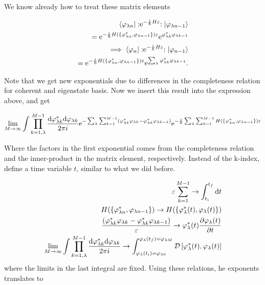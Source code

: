 We know already how to treat these matrix elements

\begin{align*}
    \bra{\varphi_{\lambda n}} :\mathrel{\mathrm{e}^{-\frac{i}{\hbar} H \varepsilon}}:\ket{\varphi_{\lambda n-1}} \\ = \mathrm{e}^{-\frac{i}{\hbar} H(\{\varphi_{\lambda n}^{*}, \varphi_{\lambda n-1}\}) \varepsilon } \mathrm{e}^{\varphi_{\lambda k}^{*}\varphi_{\lambda k-1}} \\ 
    \implies \bra{\varphi_{n}} :\mathrel{\mathrm{e}^{-\frac{i}{\hbar} H \varepsilon}}:\ket{\varphi_{n-1}} \\ = \mathrm{e}^{-\frac{i}{\hbar} H(\{\varphi_{\lambda n}^{*}, \varphi_{\lambda n-1}\} ) \varepsilon} \mathrm{e}^{\sum_{\lambda} \varphi_{\lambda k}^{*}\varphi_{\lambda k-1}}.
\end{align*}

Note that we get new exponentials due to differences in the completeness relation for coherent and eigenstate basis. Now we insert this result into the expression above, and get

\begin{align*}
    \lim_{M \to \infty} \int \prod_{k = 1, \lambda}^{M-1} \frac{\dd \varphi_{\lambda k}^{*} \dd \varphi_{\lambda k}}{2\pi i} \mathrm{e}^{-\sum_{\lambda} \sum_{k = 1}^{M-1}\left(\varphi_{\lambda k}^{*} \varphi_{\lambda k} - \varphi_{\lambda k}^{*} \varphi_{\lambda k - 1}\right)} \mathrm{e}^{-\frac{i}{\hbar} \sum_{\lambda} \sum_{k = 1}^{M-1} H(\{\varphi_{\lambda n}^{*}, \varphi_{\lambda n-1}\} ) \varepsilon}
\end{align*}

Where the factors in the first exponential comes from the completeness relation and the inner-product in the matrix element, respectively. Instead of the k-index, define a time variable $t$, similar to what we did before. 

\begin{align*}
    \varepsilon \sum_{k = 1}^{M-1}  \to \int_{t_{i}}^{t_{f}} \dd t \\ 
    H(\{\varphi_{\lambda n}^{*}, \varphi_{\lambda n-1}\} ) \to H(\{\varphi_{\lambda}^{*}(t), \varphi_{\lambda} (t)\} ) \\ 
    \frac{\left(\varphi_{\lambda k}^{*} \varphi_{\lambda k} - \varphi_{\lambda k}^{*} \varphi_{\lambda k - 1}\right)}{\varepsilon} \to \varphi_{\lambda}^{*}(t) \pdv{\varphi_{\lambda}(t)}{t} \\
    \lim_{M \to \infty} \int \prod_{k = 1, \lambda}^{M-1} \frac{\dd \varphi_{\lambda k}^{*} \dd \varphi_{\lambda k}}{2\pi i} \to \int_{\varphi_{\lambda}(t_{i}) = \varphi_{\lambda 0}}^{\varphi_{\lambda}(t_{f}) = \varphi_{\lambda M}} \mathcal{D} \left[\varphi_{\lambda}^{*}(t), \varphi_{\lambda} (t)\right]
\end{align*}
 where the limits in the last integral are fixed. Using these relations, he exponents translates to 
 
